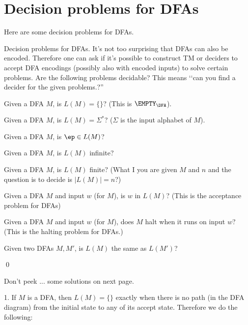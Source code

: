 \section{Decision problems for DFAs}

Here are some decision problems for DFAs.

\begin{ex}
  Decision problems for DFAs.
  It's not too surprising that DFAs can also be encoded.
  Therefore one can ask if it's possible to construct TM or deciders
  to accept DFA encodings (possibly also with encoded  inputs) to
  solve certain problems.
  Are the following problems decidable?
  This means \lq\lq can you find a decider for the given problems.?''
  \begin{tightlist}
    \item Given a DFA $M$, is $L(M) = \{\}$?
    (This is $\EMPTY_\DFA$).
    \item Given a DFA $M$, is $L(M) = \Sigma^*$? ($\Sigma$ is the
    input alphabet of $M$).
    \item Given a DFA $M$, is $\ep \in L(M)$?
    \item Given a DFA $M$, is $L(M)$ infinite?
    \item Given a DFA $M$, is $L(M)$ finite? (What I you are given $M$ and $n$
      and the question is to decide is $|L(M)| = n$?)
    \item Given a DFA $M$ and input $w$ (for $M$), is $w$ in $L(M)$?
    (This is the acceptance problem for DFAs)
    \item Given a DFA $M$ and input $w$ (for $M$), does $M$ halt when
    it runs on input $w$?
    (This is the halting problem for DFAs.)
    \item Given two DFAs $M, M'$, is $L(M)$ the same as $L(M')$?
  \end{tightlist}
  \qed
\end{ex}

Don't peek ... some solutions on next page.

\newpage
\SOLUTION

1.
If $M$ is a DFA, then $L(M) = \{\}$ exactly when there is no
path (in the DFA diagram) from the initial state to any of its
accept state. Therefore we do the following:

